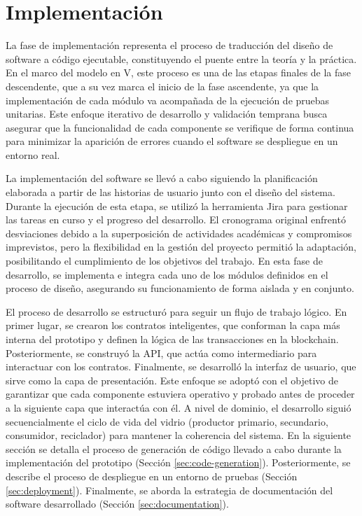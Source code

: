 \chapter[Implementación]{Implementación}
\label{cp:implementation}

\parindent0pt

La fase de implementación representa el proceso de traducción del diseño de software a código ejecutable, constituyendo el puente entre la teoría y la práctica. En el marco del modelo en V, este proceso es una de las etapas finales de la fase descendente, que a su vez marca el inicio de la fase ascendente, ya que la implementación de cada módulo va acompañada de la ejecución de pruebas unitarias. Este enfoque iterativo de desarrollo y validación temprana busca asegurar que la funcionalidad de cada componente se verifique de forma continua para minimizar la aparición de errores cuando el software se despliegue en un entorno real.

La implementación del software se llevó a cabo siguiendo la planificación elaborada a partir de las historias de usuario junto con el diseño del sistema. Durante la ejecución de esta etapa, se utilizó la herramienta Jira para gestionar las tareas en curso y el progreso del desarrollo. El cronograma original enfrentó desviaciones debido a la superposición de actividades académicas y compromisos imprevistos, pero la flexibilidad en la gestión del proyecto permitió la adaptación, posibilitando el cumplimiento de los objetivos del trabajo. En esta fase de desarrollo, se implementa e integra cada uno de los módulos definidos en el proceso de diseño, asegurando su funcionamiento de forma aislada y en conjunto.

El proceso de desarrollo se estructuró para seguir un flujo de trabajo lógico. En primer lugar, se crearon los contratos inteligentes, que conforman la capa más interna del prototipo y definen la lógica de las transacciones en la blockchain. Posteriormente, se construyó la API, que actúa como intermediario para interactuar con los contratos. Finalmente, se desarrolló la interfaz de usuario, que sirve como la capa de presentación. Este enfoque se adoptó con el objetivo de garantizar que cada componente estuviera operativo y probado antes de proceder a la siguiente capa que interactúa con él. A nivel de dominio, el desarrollo siguió secuencialmente el ciclo de vida del vidrio (productor primario, secundario, consumidor, reciclador) para mantener la coherencia del sistema. En la siguiente sección se detalla el proceso de generación de código llevado a cabo durante la implementación del prototipo (Sección \ref{sec:code-generation}). Posteriormente, se describe el proceso de despliegue en un entorno de pruebas (Sección \ref{sec:deployment}). Finalmente, se aborda la estrategia de documentación del software desarrollado (Sección \ref{sec:documentation}).
	
